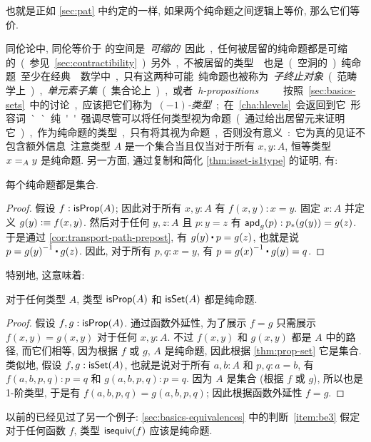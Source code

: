 也就是正如 \cref{sec:pat} 中约定的一样, 如果两个纯命题之间逻辑上等价, 那么它们等价.

同伦论中, 同伦等价于 \unit 的空间是\emph{可缩的}.
因此, 任何被居留的纯命题都是可缩的 (参见 \cref{sec:contractibility}).
另外, 不被居留的类型 \emptyt 也是 (空洞的) 纯命题.
至少在经典数学中, 只有这两种可能.

纯命题也被称为\emph{子终止对象} (范畴学上), \emph{单元素子集} (集合论上), 或者\emph{h-propositions}.
%
%
%
按照 \cref{sec:basics-sets} 中的讨论, 应该把它们称为 \emph{$(-1)$-类型}; 在 \cref{cha:hlevels} 会返回到它.
形容词 ``纯'' 强调尽管可以将任何类型视为命题 (通过给出居留元来证明它), 作为纯命题的类型, 只有将其视为命题, 否则没有意义: 它为真的见证不包含额外信息.

注意类型 $A$ 是一个集合当且仅当对于所有 $x,y:A$, 恒等类型 $\id[A]xy$ 是纯命题.
另一方面, 通过复制和简化 \cref{thm:isset-is1type} 的证明, 有:

\begin{lem}\label{thm:prop-set}
  每个纯命题都是集合.
\end{lem}
\begin{proof}
  假设 $f:\isprop(A)$; 因此对于所有 $x,y:A$ 有 $f(x,y):x=y$.
  固定 $x:A$ 并定义 $g(y)\defeq f(x,y)$.
  然后对于任何 $y,z:A$ 且 $p:y=z$ 有 $\apd g p : \trans{p}{g(y)}={g(z)}$.
  于是通过 \cref{cor:transport-path-prepost}, 有 $g(y)\ct p = g(z)$, 也就是说 $p=\opp{g(y)}\ct g(z)$.
  因此, 对于所有 $p,q:x=y$, 有 $p = \opp{g(x)}\ct g(y) = q$.
\end{proof}

特别地, 这意味着:

\begin{lem}\label{thm:isprop-isprop}\label{thm:isprop-isset}
  对于任何类型 $A$, 类型 $\isprop(A)$ 和 $\isset(A)$ 都是纯命题.
\end{lem}
\begin{proof}
  假设 $f,g:\isprop(A)$.
  通过函数外延性, 为了展示 $f=g$ 只需展示 $f(x,y)=g(x,y)$ 对于任何 $x,y:A$.
  不过 $f(x,y)$ 和 $g(x,y)$ 都是 $A$ 中的路径, 而它们相等, 因为根据 $f$ 或 $g$, $A$ 是纯命题, 因此根据 \cref{thm:prop-set} 它是集合.
  类似地, 假设 $f,g:\isset(A)$, 也就是说对于所有 $a,b:A$ 和 $p,q:a=b$, 有 $f(a,b,p,q):p=q$ 和 $g(a,b,p,q):p=q$.
  因为 $A$ 是集合 (根据 $f$ 或 $g$), 所以也是 1-阶类型, 于是有 $f(a,b,p,q)=g(a,b,p,q)$;
  因此根据函数外延性 $f=g$.
\end{proof}

以前的已经见过了另一个例子: \cref{sec:basics-equivalences} 中的判断~\ref{item:be3} 假定对于任何函数 $f$, 类型 $\isequiv (f)$ 应该是纯命题.

%
%
